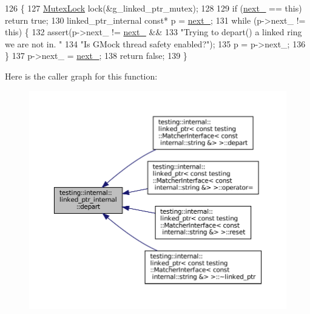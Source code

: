 \begin{DoxyCode}
126                                                \{
127     \hyperlink{namespacetesting_1_1internal_a08b187c6cc4e28400aadf9a32fccc8de}{MutexLock} lock(&g\_linked\_ptr\_mutex);
128 
129     \textcolor{keywordflow}{if} (\hyperlink{classtesting_1_1internal_1_1linked__ptr__internal_ae4397a65a4d76a24547fcf2cd17131d8}{next\_} == \textcolor{keyword}{this}) \textcolor{keywordflow}{return} \textcolor{keyword}{true};
130     linked\_ptr\_internal \textcolor{keyword}{const}* p = \hyperlink{classtesting_1_1internal_1_1linked__ptr__internal_ae4397a65a4d76a24547fcf2cd17131d8}{next\_};
131     \textcolor{keywordflow}{while} (p->next\_ != \textcolor{keyword}{this}) \{
132       assert(p->next\_ != \hyperlink{classtesting_1_1internal_1_1linked__ptr__internal_ae4397a65a4d76a24547fcf2cd17131d8}{next\_} &&
133              \textcolor{stringliteral}{"Trying to depart() a linked ring we are not in. "}
134              \textcolor{stringliteral}{"Is GMock thread safety enabled?"});
135       p = p->next\_;
136     \}
137     p->next\_ = \hyperlink{classtesting_1_1internal_1_1linked__ptr__internal_ae4397a65a4d76a24547fcf2cd17131d8}{next\_};
138     \textcolor{keywordflow}{return} \textcolor{keyword}{false};
139   \}
\end{DoxyCode}
Here is the caller graph for this function\+:
\nopagebreak
\begin{figure}[H]
\begin{center}
\leavevmode
\includegraphics[width=350pt]{classtesting_1_1internal_1_1linked__ptr__internal_a8699e539d9702d363ef0351012d1b3ca_icgraph}
\end{center}
\end{figure}
\mbox{\label{classtesting_1_1internal_1_1linked__ptr__internal_acd5a341459f7e81b10b4112d8c764e2a}} 
